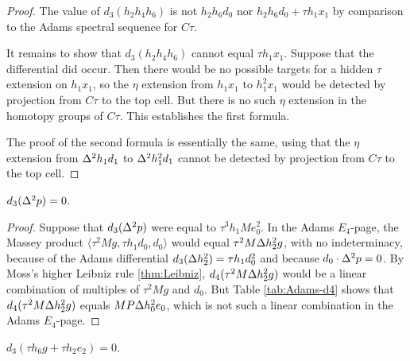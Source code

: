 \begin{proof}
The value of $d_3(h_2 h_4 h_6)$ is not $h_2 h_6 d_0$ nor
$h_2 h_6 d_0 + \tau h_1 x_1$ by comparison to the Adams
spectral sequence for $C\tau$.

It remains to show that $d_3(h_2 h_4 h_6)$ cannot equal $\tau h_1 x_1$.
Suppose that the differential did occur.
Then there would be no possible targets for a 
hidden $\tau$ extension on $h_1 x_1$,
so the $\eta$ extension from $h_1 x_1$ to $h_1^2 x_1$ would be detected
by projection from $C\tau$ to the top cell.  But there 
is no such $\eta$ extension in the homotopy groups of $C\tau$.
This establishes the first formula.

The proof of the second formula is essentially the same,
using that the $\eta$ extension
from $\Delta^2 h_1 d_1$ to $\Delta^2 h_1^2 d_1$ cannot be
detected by projection from $C\tau$ to the top cell.
\end{proof}

\begin{lemma}
\label{lem:d3-D^2p}
$d_3(\Delta^2 p) = 0$.
\end{lemma}

\begin{proof}
Suppose that $d_3(\Delta^2 p)$ were equal to $\tau^3 h_1 M e_0^2$.
In the Adams $E_4$-page,
the Massey product $\langle \tau^2 M g, \tau h_1 d_0, d_0 \rangle$
would equal $\tau^2 M \Delta h_2^2 g$, with no indeterminacy,
because of the Adams differential $d_3(\Delta h_2^2) = \tau h_1 d_0^2$
and because $d_0 \cdot \Delta^2 p = 0$.
By Moss's higher Leibniz rule \ref{thm:Leibniz},
$d_4(\tau^2 M \Delta h_2^2 g)$ would be a linear
combination of multiples of $\tau^2 M g$ and $d_0$.
But Table \ref{tab:Adams-d4} shows that $d_4(\tau^2 M \Delta h_2^2 g)$
equals $M P \Delta h_0^2 e_0$, which is not such a linear combination
in the Adams $E_4$-page.
\end{proof}

\begin{lemma}
\label{lem:d3-th6g}
$d_3(\tau h_6 g + \tau h_2 e_2) = 0$.
\end{lemma}

